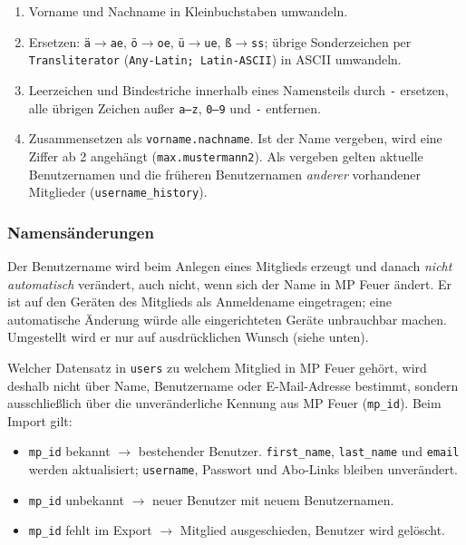 \documentclass[a4paper,fontsize=10pt]{scrartcl}
\newcommand{\code}[1]{\texttt{#1}}
\begin{document}
\begin{enumerate}
  \item Vorname und Nachname in Kleinbuchstaben umwandeln.
  \item Ersetzen: \code{ä}$\rightarrow$\code{ae}, \code{ö}$\rightarrow$\code{oe}, \code{ü}$\rightarrow$\code{ue}, \code{ß}$\rightarrow$\code{ss};
        übrige Sonderzeichen per \code{Transliterator}
        (\code{Any-Latin; Latin-ASCII}) in ASCII umwandeln.
  \item Leerzeichen und Bindestriche innerhalb eines Namensteils durch
        \code{-} ersetzen, alle übrigen Zeichen außer \code{a--z},
        \code{0--9} und \code{-} entfernen.
  \item Zusammensetzen als \code{vorname.nachname}. Ist der Name vergeben,
        wird eine Ziffer ab 2 angehängt (\code{max.mustermann2}). Als
        vergeben gelten aktuelle Benutzernamen und die früheren
        Benutzernamen \emph{anderer} vorhandener Mitglieder
        (\code{username\_history}).
\end{enumerate}

\subsubsection*{Namensänderungen}

Der Benutzername wird beim Anlegen eines Mitglieds erzeugt und danach
\emph{nicht automatisch} verändert, auch nicht, wenn sich der Name in MP Feuer
ändert. Er ist auf den Geräten des Mitglieds als Anmeldename eingetragen; eine
automatische Änderung würde alle eingerichteten Geräte unbrauchbar machen.
Umgestellt wird er nur auf ausdrücklichen Wunsch (siehe unten).

Welcher Datensatz in \code{users} zu welchem Mitglied in MP Feuer gehört,
wird deshalb nicht über Name, Benutzername oder E-Mail-Adresse bestimmt,
sondern ausschließlich über die unveränderliche Kennung aus MP Feuer
(\code{mp\_id}). Beim Import gilt:

\begin{itemize}
  \item \code{mp\_id} bekannt $\rightarrow$ bestehender Benutzer.
        \code{first\_name}, \code{last\_name} und \code{email} werden
        aktualisiert; \code{username}, Passwort und Abo-Links bleiben
        unverändert.
  \item \code{mp\_id} unbekannt $\rightarrow$ neuer Benutzer mit neuem
        Benutzernamen.
  \item \code{mp\_id} fehlt im Export $\rightarrow$ Mitglied ausgeschieden,
        Benutzer wird gelöscht.
\end{itemize}
\end{document}
